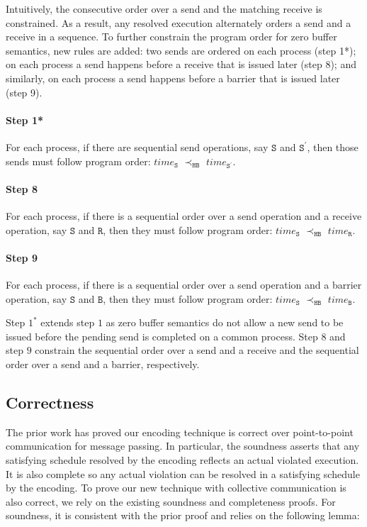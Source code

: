 Intuitively, the consecutive order over a send and the matching receive is constrained. As a result, any resolved execution alternately orders a send and a receive in a sequence. To further constrain the program order for zero buffer semantics, new rules are added: two sends are ordered on each process (step 1*); on each process a send happens before a receive that is issued later (step 8); and similarly, on each process a send happens before a barrier that is issued later (step 9).

\paragraph*{Step 1*} For each process, if there are sequential send
operations, say $\mathtt{S}$ and $\mathtt{S^\prime}$, then those
sends must follow program order: $\mathit{time}_\mathtt{S}$
$\prec_\mathtt{HB}$ $\mathit{time}_\mathtt{S^\prime}$.

\paragraph*{Step 8} For each process, if there is a sequential order over a send operation and a receive operation, say $\mathtt{S}$ and $\mathtt{R}$, then they must follow program order: 
$\mathit{time}_\mathtt{S}$
$\prec_\mathtt{HB}$ $\mathit{time}_\mathtt{R}$.

\paragraph*{Step 9} For each process, if there is a sequential order over a send operation and a barrier operation, say $\mathtt{S}$ and $\mathtt{B}$, then they must follow program order: 
$\mathit{time}_\mathtt{S}$
$\prec_\mathtt{HB}$ $\mathit{time}_\mathtt{B}$.

Step $1^*$ extends step $1$ as zero buffer semantics do not allow a new send to be issued before the pending send is completed on a common process. Step $8$ and step $9$ constrain the sequential order over a send and a receive and the sequential order over a send and a barrier, respectively.

\subsection{Correctness}

The prior work \cite{DBLP:conf/kbse/HuangMM13} has proved our encoding technique is correct over point-to-point communication for message passing. In particular, the soundness asserts that any satisfying schedule resolved by the encoding reflects an actual violated execution. It is also complete so any actual violation can be resolved in a satisfying schedule by the encoding. To prove our new technique with collective communication is also correct, we rely on the existing soundness and completeness proofs. For soundness, it is consistent with the prior proof and relies on the following lemma: 

